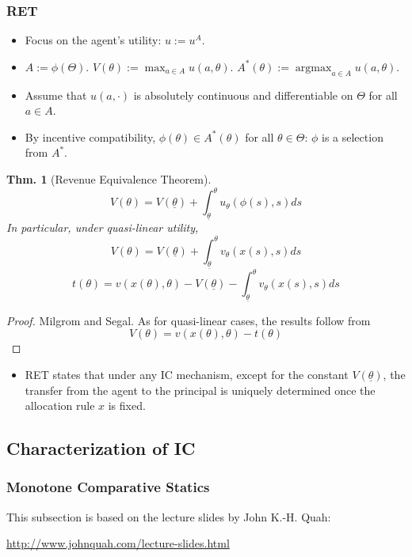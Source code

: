 \documentclass[11pt,a4paper,dvipdfmx]{article}
\theoremstyle{plain}
\newtheorem{thm}{Thm.}[section]
\newcommand{\1}{\mathbbm{1}}
\DeclareMathOperator*{\argmax}{argmax}
\begin{document}
\subsubsection{RET}
\begin{itemize}
	\item Focus on the agent's utility: $u := u^A$.
	\item $A := \phi(\Theta)$. $V(\theta) := \max_{a \in A} u(a, \theta)$. $A^*(\theta) := \argmax_{a \in A} u(a, \theta)$.
	\item Assume that $u(a, \cdot)$ is absolutely continuous and differentiable on $\Theta$ for all $a \in A$.
	\item By incentive compatibility, $\phi(\theta) \in A^*(\theta)$ for all $\theta \in \Theta$: $\phi$ is a selection from $A^*$.
\end{itemize}

\begin{thm}[Revenue Equivalence Theorem]
	\[
	V(\theta) = V(\underline{\theta}) + \int_{\underline{\theta}}^\theta
	 u_\theta(\phi(s), s) ds
	\]
	In particular, under quasi-linear utility, 
	\[
	V(\theta) = V(\underline{\theta}) + \int_{\underline{\theta}}^\theta
	 v_\theta(x(s), s) ds
	\]
	\[
	t(\theta) = v(x(\theta), \theta) - V(\underline{\theta}) - \int_{\underline{\theta}}^\theta
	 v_\theta(x(s), s) ds
	\]
\end{thm}
\begin{proof}
	Milgrom and Segal. As for quasi-linear cases, the results follow from
	$$
	V(\theta) = v(x(\theta), \theta) - t(\theta)
	$$
\end{proof}

\begin{itemize}
	\item RET states that under any IC mechanism, except for the constant $V(\underline{\theta})$, the transfer from the agent to the principal is uniquely determined once the allocation rule $x$ is fixed.
\end{itemize}


\subsection{Characterization of IC}
\subsubsection{Monotone Comparative Statics}
This subsection is based on the lecture slides by John K.-H. Quah:

\url{http://www.johnquah.com/lecture-slides.html}
\end{document}
